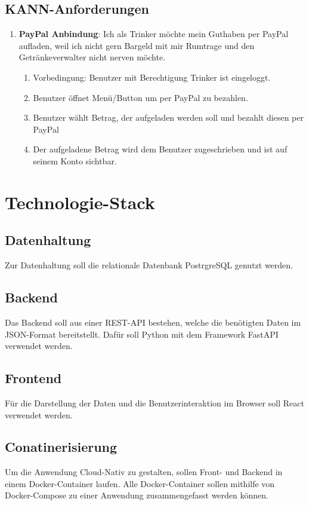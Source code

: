 \documentclass[conference,a4paper]{cs-techrep}
\begin{document}
\subsection{KANN-Anforderungen}

\begin{enumerate}[{USC}1]

\item \textbf{PayPal Anbindung}: Ich als Trinker möchte mein Guthaben per PayPal aufladen, weil ich nicht gern Bargeld mit mir Rumtrage und den Getränkeverwalter nicht nerven möchte.
\begin{enumerate}
	\item Vorbedingung: Benutzer mit Berechtigung Trinker ist eingeloggt.
	\item Benutzer öffnet Menü/Button um per PayPal zu bezahlen.
	\item Benutzer wählt Betrag, der aufgeladen werden soll und bezahlt diesen per PayPal
	\item Der aufgeladene Betrag wird dem Benutzer zugeschrieben und ist auf seinem Konto sichtbar.
\end{enumerate}

\end{enumerate}

\section{Technologie-Stack}
\subsection{Datenhaltung}
Zur Datenhaltung soll die relationale Datenbank PostrgreSQL genutzt werden.
\subsection{Backend}
Das Backend soll aus einer REST-API bestehen, welche die benötigten Daten im JSON-Format bereitstellt. Dafür soll Python mit dem Framework FastAPI verwendet werden.
\subsection{Frontend}
Für die Darstellung der Daten und die Benutzerinteraktion im Browser soll React verwendet werden.
\subsection{Conatinerisierung}
Um die Anwendung Cloud-Nativ zu gestalten, sollen Front- und Backend in einem Docker-Container laufen. Alle Docker-Container sollen mithilfe von Docker-Compose zu einer Anwendung zusammengefasst werden können.
\end{document}
